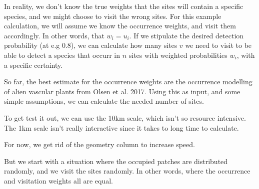 \documentclass[]{article}
\newenvironment{Shaded}{\begin{snugshade}}{\end{snugshade}}
\newcommand{\KeywordTok}[1]{\textcolor[rgb]{0.13,0.29,0.53}{\textbf{#1}}}
\newcommand{\DataTypeTok}[1]{\textcolor[rgb]{0.13,0.29,0.53}{#1}}
\newcommand{\DecValTok}[1]{\textcolor[rgb]{0.00,0.00,0.81}{#1}}
\newcommand{\StringTok}[1]{\textcolor[rgb]{0.31,0.60,0.02}{#1}}
\newcommand{\OtherTok}[1]{\textcolor[rgb]{0.56,0.35,0.01}{#1}}
\newcommand{\OperatorTok}[1]{\textcolor[rgb]{0.81,0.36,0.00}{\textbf{#1}}}
\newcommand{\NormalTok}[1]{#1}
\begin{document}
In reality, we don't know the true weights that the sites will contain a
specific species, and we might choose to visit the wrong sites. For this
example calculation, we will assume we know the occurrence weights, and
visit them accordingly. In other words, that \(w_i = u_i\). If we
stipulate the desired detection probability (at e.g 0.8), we can
calculate how many sites \(v\) we need to visit to be able to detect a
species that occurr in \(n\) sites with weighted probabilities \(w_i\),
with a specific certainty.

So far, the best estimate for the occurrence weights are the occurrence
modelling of alien vascular plants from Olsen et al. 2017. Using this as
input, and some simple assumptions, we can calculate the needed number
of sites.

To get test it out, we can use the 10km scale, which isn't so resource
intensive. The 1km scale isn't really interactive since it takes to long
time to calculate.

For now, we get rid of the geometry column to increase speed.

\begin{Shaded}
\end{Shaded}

But we start with a situation where the occupied patches are distributed
randomly, and we visit the sites randomly. In other words, where the
occurrence and visitation weights all are equal.

\begin{Shaded}
\end{Shaded}
\end{document}
